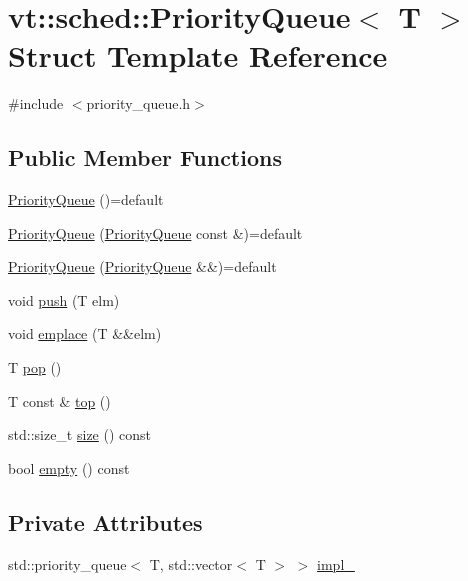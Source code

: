 \hypertarget{structvt_1_1sched_1_1_priority_queue}{}\section{vt\+:\+:sched\+:\+:Priority\+Queue$<$ T $>$ Struct Template Reference}
\label{structvt_1_1sched_1_1_priority_queue}


{\ttfamily \#include $<$priority\+\_\+queue.\+h$>$}

\subsection*{Public Member Functions}
\begin{DoxyCompactItemize}
\item 
\hyperlink{structvt_1_1sched_1_1_priority_queue_a03986418bd682344f22d1e0a5d4a3e3a}{Priority\+Queue} ()=default
\item 
\hyperlink{structvt_1_1sched_1_1_priority_queue_aca0fe178fbd601fa22816c2d895d5435}{Priority\+Queue} (\hyperlink{structvt_1_1sched_1_1_priority_queue}{Priority\+Queue} const \&)=default
\item 
\hyperlink{structvt_1_1sched_1_1_priority_queue_a25eedffc3b4665d0c1bb27027803e571}{Priority\+Queue} (\hyperlink{structvt_1_1sched_1_1_priority_queue}{Priority\+Queue} \&\&)=default
\item 
void \hyperlink{structvt_1_1sched_1_1_priority_queue_af532279184e76da6c72a52664d6a9922}{push} (T elm)
\item 
void \hyperlink{structvt_1_1sched_1_1_priority_queue_a152f4592447d7c478fe6aa0f8fbd5173}{emplace} (T \&\&elm)
\item 
T \hyperlink{structvt_1_1sched_1_1_priority_queue_aec357e1233dcb2991105795640372f8a}{pop} ()
\item 
T const  \& \hyperlink{structvt_1_1sched_1_1_priority_queue_ad5f072e3452ba8b950456bc4b072deb1}{top} ()
\item 
std\+::size\+\_\+t \hyperlink{structvt_1_1sched_1_1_priority_queue_a017313382884e652da648d274a09b80d}{size} () const
\item 
bool \hyperlink{structvt_1_1sched_1_1_priority_queue_aaee204c658c333cd9bb30615bcb35e07}{empty} () const
\end{DoxyCompactItemize}
\subsection*{Private Attributes}
\begin{DoxyCompactItemize}
\item 
std\+::priority\+\_\+queue$<$ T, std\+::vector$<$ T $>$ $>$ \hyperlink{structvt_1_1sched_1_1_priority_queue_a7b4a0abb373f4810e869bfc11303f487}{impl\+\_\+}
\end{DoxyCompactItemize}


